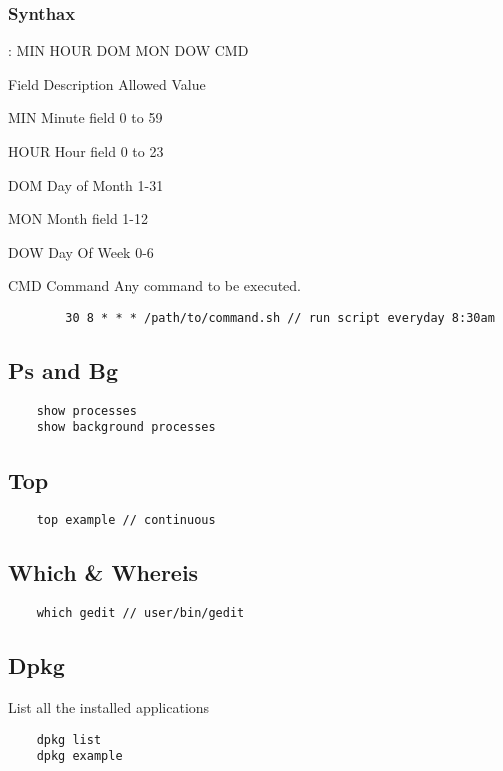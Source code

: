         \subsubsection{Synthax}

        : MIN HOUR DOM MON DOW CMD

        Field    Description    Allowed Value

        MIN      Minute field    0 to 59

        HOUR     Hour field      0 to 23

        DOM      Day of Month    1-31

        MON      Month field     1-12

        DOW      Day Of Week     0-6

        CMD      Command         Any command to be executed.

        \begin{verbatim}
        30 8 * * * /path/to/command.sh // run script everyday 8:30am
        \end{verbatim}
    \subsection{Ps and Bg}
\begin{verbatim}
    show processes
    show background processes
\end{verbatim}

    \subsection{Top}
    \begin{verbatim}
    top example // continuous
    \end{verbatim}
    \subsection{Which & Whereis}
    \begin{verbatim}
    which gedit // user/bin/gedit 
    \end{verbatim}

    \subsection{Dpkg}

         List all the installed applications
    \begin{verbatim}
    dpkg list
    dpkg example 
    \end{verbatim}

